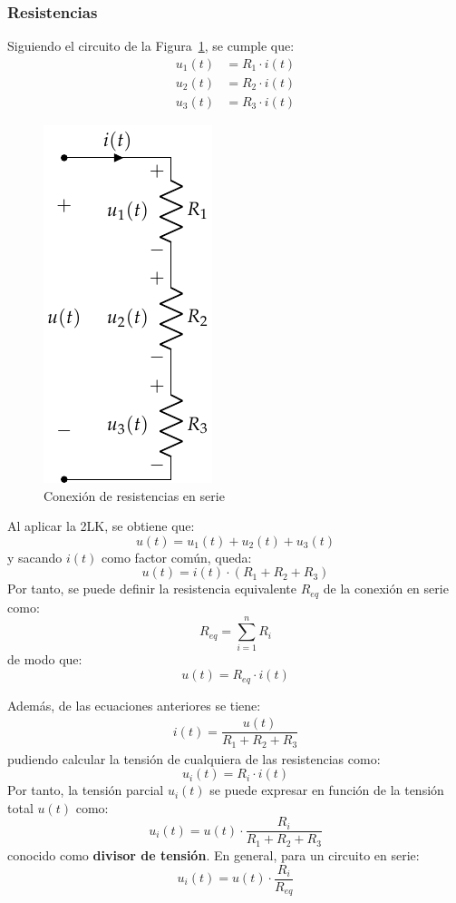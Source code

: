 \documentclass[11pt]{book} %
\begin{document}
	\subsubsection{Resistencias}
	Siguiendo el circuito de la Figura~\ref{fig.serie}, se cumple que:
		\begin{align*}
			u_1(t) &= R_1 \cdot i(t)\\
			u_2(t) &= R_2 \cdot i(t)\\
			u_3(t) &= R_3 \cdot i(t)
		\end{align*}
		\begin{figure}[htbp]
			\centering
			\includegraphics[width=0.2\linewidth]{../figs/AsociacionSerie.pdf}
			\caption{Conexión de resistencias en serie}
			\label{fig.serie}
		\end{figure}
		Al aplicar la 2LK, se obtiene que: 
		\begin{equation*}
			u(t) = u_1(t) + u_2(t) + u_3(t)
		\end{equation*}
		y sacando $i(t)$ como factor común, queda:
		\begin{equation*}
			u(t) = i(t) \cdot (R_1 + R_2 + R_3)
		\end{equation*}
		Por tanto, se puede definir la resistencia equivalente $R_{eq}$ de la conexión en serie como:
		\begin{equation}
			\boxed{R_{eq} = \sum_{i = 1}^n R_i}
		\end{equation}
		de modo que:
		\begin{equation*}
			u(t) = R_{eq} \cdot i(t)
		\end{equation*}
		
		Además, de las ecuaciones anteriores se tiene:
		\begin{align*}
			i(t) = \dfrac{u(t)}{R_1 + R_2 + R_3}
		\end{align*}
		pudiendo calcular la tensión de cualquiera de las resistencias como: 
		\begin{equation*}
			u_i(t) = R_i \cdot i(t)
		\end{equation*}
		Por tanto, la tensión parcial $u_i(t)$ se puede expresar en función de la tensión total $u(t)$ como: 
		\begin{equation*}
			u_i(t) = u(t) \cdot \frac{R_i}{R_1 + R_2 + R_3}
		\end{equation*}
		conocido como \textbf{divisor de tensión}. En general, para un circuito en serie:
		\begin{equation}
			\boxed{u_i(t) = u(t) \cdot \frac{R_i}{R_{eq}}}
		\end{equation}
\end{document}
